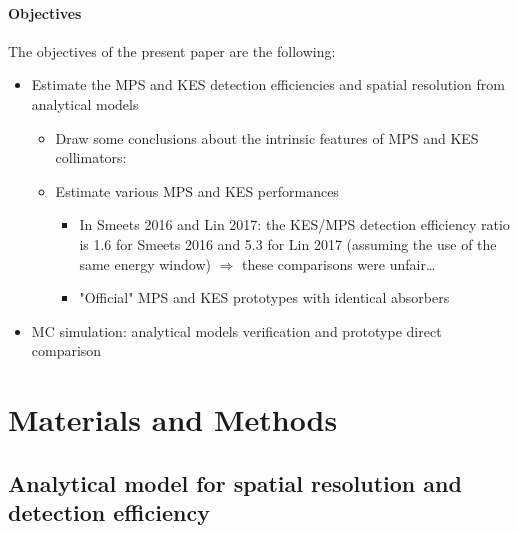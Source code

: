 \documentclass[a4paper,english]{article}
\begin{document}
\paragraph{Objectives}
The objectives of the present paper are the following:

\begin{itemize}
  \item Estimate the MPS and KES detection efficiencies and spatial resolution from analytical models
  \begin{itemize}
    \item Draw some conclusions about the intrinsic features of MPS and KES collimators:  
    \item Estimate various MPS and KES performances 
    \begin{itemize}
    	\item In Smeets 2016 and Lin 2017: the KES/MPS detection efficiency ratio is 1.6 for Smeets 2016 and 5.3 for Lin 2017 (assuming the use of the same energy window) $\Rightarrow$ these comparisons were unfair\dots    
        \item "Official" MPS and KES prototypes with identical absorbers 
    \end{itemize}    
  \end{itemize}
  \item MC simulation: analytical models verification and prototype direct comparison
\end{itemize}  


\section{Materials and Methods}

\subsection{Analytical model for spatial resolution and detection efficiency}
\end{document}

